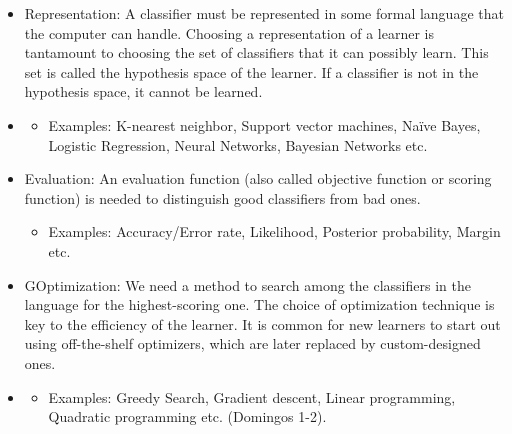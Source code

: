 \documentclass[a4paper,12pt]{report}
\begin{document}
\begin{itemize}[,]
    \setlength\itemsep{-.1cm}
    \item Representation: A classifier must be represented in some formal language that the computer can handle. Choosing a representation of a learner is tantamount to choosing the set of classifiers that it can possibly learn. This set is called the hypothesis space of the learner. If a classifier is not in the hypothesis space, it cannot be learned.
    \vspace*{-2mm}
    \item \begin{itemize}[,]
        \setlength\itemsep{0cm}
        \item Examples: K-nearest neighbor, Support vector machines, Naïve Bayes, Logistic Regression, Neural Networks, Bayesian Networks etc.
    \end{itemize}
    \item Evaluation: An evaluation function (also called objective function or scoring function) is needed to distinguish good classifiers from bad ones.
    \vspace*{-2mm}
    \begin{itemize}[,]
        \setlength\itemsep{0cm}
        \item Examples: Accuracy/Error rate, Likelihood, Posterior probability, Margin etc.
    \end{itemize}
    \item GOptimization: We need a method to search among the classifiers in the language for the highest-scoring one. The choice of optimization technique is key to the efficiency of the learner. It is common for new learners to start out using off-the-shelf optimizers, which are later replaced by custom-designed ones.
    \vspace*{-2mm}
    \item \begin{itemize}[,]
        \setlength\itemsep{0cm}
        \item Examples: Greedy Search, Gradient descent, Linear programming, Quadratic programming etc. (Domingos 1-2).
    \end{itemize}
\end{itemize}
\end{document}
